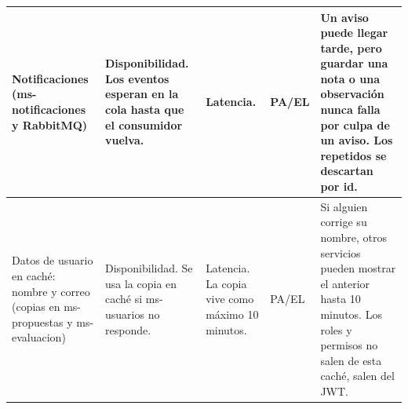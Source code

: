 \begin{longtable}{@{}L{2.6cm}L{3.4cm}L{3.0cm}L{1.5cm}L{4.3cm}@{}}
\midrule
Notificaciones (ms-notificaciones y RabbitMQ) & Disponibilidad. Los eventos esperan en la cola hasta que el consumidor vuelva. & Latencia. & PA/EL & Un aviso puede llegar tarde, pero guardar una nota o una observación nunca falla por culpa de un aviso. Los repetidos se descartan por id. \\
\midrule
Datos de usuario en caché: nombre y correo (copias en ms-propuestas y ms-evaluacion) & Disponibilidad. Se usa la copia en caché si ms-usuarios no responde. & Latencia. La copia vive como máximo 10 minutos. & PA/EL & Si alguien corrige su nombre, otros servicios pueden mostrar el anterior hasta 10 minutos. Los roles y permisos no salen de esta caché, salen del JWT. \\
\end{longtable}
\endgroup
